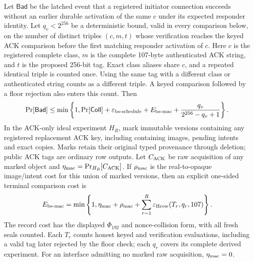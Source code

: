 \begin{theorem}
\label{thm:bootstrap-terminal}
Let $\mathsf{Bad}$ be the latched event that a registered initiator
connection succeeds without an earlier durable activation of the same
$c$ under its expected responder identity. Let $q_v<2^{256}$ be a
deterministic bound, valid in every comparison below, on the number of
distinct triples $(c,m,t)$ whose verification reaches the keyed ACK
comparison before the first matching responder activation of $c$.
Here $c$ is the registered complete class, $m$ is the complete 107-byte
authenticated ACK string, and $t$ is the proposed 256-bit tag. Exact
class aliases share $c$, and a repeated identical triple is counted once.
Using the same tag with a different class or authenticated string counts
as a different triple. A keyed comparison followed by a floor rejection
also enters this count. Then
\begin{equation}
 \Pr[\mathsf{Bad}]\le\min\left\{1,
  \Pr[\mathsf{Coll}]+\varepsilon_{\rm bs\text{-}schedule}
  +E_{\rm bs\text{-}mac}
  +\frac{q_v}{2^{256}-q_v+1}\right\}.
 \label{eq:bootstrap-terminal}
\end{equation}
In the ACK-only ideal experiment $H_R$, mark immutable versions containing
any registered replacement ACK key, including containing images, pending
intents and exact copies. Marks retain their original typed provenance
through deletion; public ACK tags are ordinary row outputs. Let
$C_{\rm ACK}$ be raw acquisition of any marked object and
$\eta_{\rm mac}=\Pr_{H_R}[C_{\rm ACK}]$. If $\rho_{\rm mac}$ is the
real-to-opaque image/intent cost for this union of marked versions, then
an explicit one-sided terminal comparison cost is
\begin{equation}
 E_{\rm bs\text{-}mac}=\min\left\{1,
   \eta_{\rm mac}+\rho_{\rm mac}
   +\sum_{r=1}^{R}\varepsilon_{\rm Hrow}(T_r,q_r,107)\right\}.
 \label{eq:bootstrap-mac-records}
\end{equation}
The record cost has the displayed $\Phi_{192}$ and nonce-collision
form, with all fresh seals counted. Each $T_r$ counts honest keyed
and verification evaluations, including a valid tag later rejected by
the floor check; each $q_r$ covers its complete derived experiment.
For an interface admitting no marked raw acquisition,
$\eta_{\rm mac}=0$.
\end{theorem}
